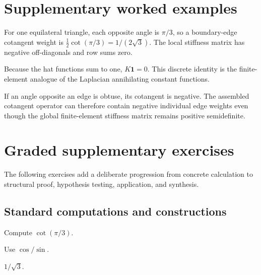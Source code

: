 \section{Supplementary worked examples}
\label{sec:vii41-pedagogy}

\begin{example}\label{ex:vii41-ped-01}
For one equilateral triangle, each opposite angle is \(\pi/3\), so a boundary-edge cotangent weight is \(\tfrac12\cot(\pi/3)=1/(2\sqrt3)\).  The local stiffness matrix has negative off-diagonals and row sums zero.
\end{example}

\begin{example}\label{ex:vii41-ped-02}
Because the hat functions sum to one, \(K\mathbf1=0\).  This discrete identity is the finite-element analogue of the Laplacian annihilating constant functions.
\end{example}

\begin{example}\label{ex:vii41-ped-03}
If an angle opposite an edge is obtuse, its cotangent is negative.  The assembled cotangent operator can therefore contain negative individual edge weights even though the global finite-element stiffness matrix remains positive semidefinite.
\end{example}

\section{Graded supplementary exercises}
The following exercises add a deliberate progression from concrete calculation to structural proof, hypothesis testing, application, and synthesis.

\subsection*{Standard computations and constructions}

\begin{exercise}\label{exr:vii41-ped-01}
Compute \(\cot(\pi/3)\).
\end{exercise}

\begin{hint}
Use \(\cos/\sin\).
\end{hint}

\begin{solution}
\(1/\sqrt3\).
\end{solution}

